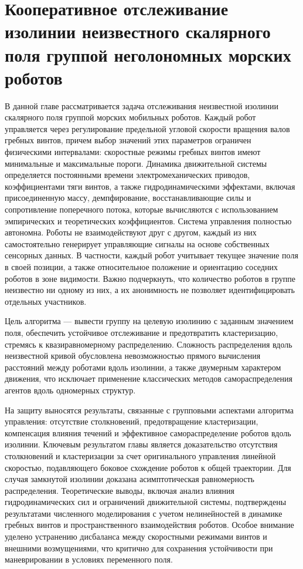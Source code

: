 \chapter{Кооперативное отслеживание изолинии неизвестного скалярного поля группой неголономных морских роботов}\label{ch:ch1}

В данной главе рассматривается задача отслеживания неизвестной изолинии скалярного поля группой морских мобильных роботов. Каждый робот управляется через регулирование предельной угловой скорости вращения валов гребных винтов, причем выбор значений этих параметров ограничен физическими интервалами: скоростные режимы гребных винтов имеют минимальные и максимальные пороги. Динамика движительной системы определяется постоянными времени электромеханических приводов, коэффициентами тяги винтов, а также гидродинамическими эффектами, включая присоединенную массу, демпфирование, восстанавливающие силы и сопротивление поперечного потока, которые вычисляются с использованием эмпирических и теоретических коэффициентов. Система управления полностью автономна. Роботы не взаимодействуют друг с другом, каждый из них самостоятельно генерирует управляющие сигналы на основе собственных сенсорных данных.
В частности, каждый робот учитывает текущее значение поля в своей позиции, а также относительное положение и ориентацию соседних роботов в зоне видимости.
Важно подчеркнуть, что количество роботов в группе неизвестно ни одному из них, а их анонимность не позволяет идентифицировать отдельных участников.

Цель алгоритма — вывести группу на целевую изолинию с заданным значением поля, обеспечить устойчивое отслеживание и предотвратить кластеризацию, стремясь к квазиравномерному распределению. Сложность распределения вдоль неизвестной кривой обусловлена невозможностью прямого вычисления расстояний между роботами вдоль изолинии, а также двумерным характером движения, что исключает применение классических методов самораспределения агентов вдоль одномерных структур.

На защиту выносятся результаты, связанные с групповыми аспектами  алгоритма управления: отсутствие столкновений, предотвращение  кластеризации, компенсация влияния течений и эффективное самораспределение роботов вдоль изолинии.
Ключевым результатом главы является доказательство отсутствия столкновений и кластеризации за счет оригинального управления линейной скоростью, подавляющего боковое схождение роботов к общей траектории.
Для случая замкнутой изолинии доказана асимптотическая равномерность распределения. Теоретические выводы, включая анализ влияния гидродинамических сил и ограничений движительной системы, подтверждены результатами численного моделирования с учетом нелинейностей в динамике гребных винтов и пространственного взаимодействия роботов. Особое внимание уделено устранению дисбаланса между скоростными режимами винтов и внешними возмущениями, что критично для сохранения устойчивости при маневрировании в условиях переменного поля.

